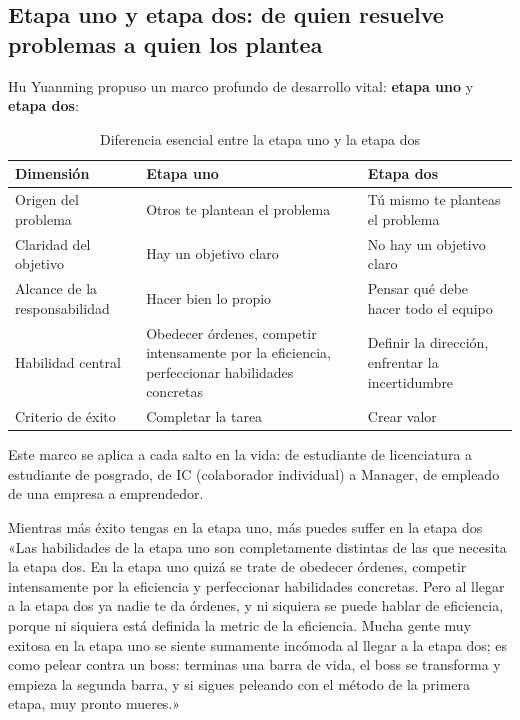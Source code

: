 \subsection{Etapa uno y etapa dos: de quien resuelve problemas a quien los plantea}

Hu Yuanming propuso un marco profundo de desarrollo vital: \textbf{etapa uno} y \textbf{etapa dos}:

\begin{table}[H]
\centering
\caption{Diferencia esencial entre la etapa uno y la etapa dos}
\begin{tabular}{lll}
\toprule
\textbf{Dimensión} & \textbf{Etapa uno} & \textbf{Etapa dos} \\
\midrule
Origen del problema & Otros te plantean el problema & Tú mismo te planteas el problema \\
Claridad del objetivo & Hay un objetivo claro & No hay un objetivo claro \\
Alcance de la responsabilidad & Hacer bien lo propio & Pensar qué debe hacer todo el equipo \\
Habilidad central & Obedecer órdenes, competir intensamente por la eficiencia, perfeccionar habilidades concretas & Definir la dirección, enfrentar la incertidumbre \\
Criterio de éxito & Completar la tarea & Crear valor \\
\bottomrule
\end{tabular}
\end{table}

Este marco se aplica a cada salto en la vida: de estudiante de licenciatura a estudiante de posgrado, de IC (colaborador individual) a Manager, de empleado de una empresa a emprendedor.

\begin{warningbox}{Mientras más éxito tengas en la etapa uno, más puedes suffer en la etapa dos}
«Las habilidades de la etapa uno son completamente distintas de las que necesita la etapa dos. En la etapa uno quizá se trate de obedecer órdenes, competir intensamente por la eficiencia y perfeccionar habilidades concretas. Pero al llegar a la etapa dos ya nadie te da órdenes, y ni siquiera se puede hablar de eficiencia, porque ni siquiera está definida la metric de la eficiencia. Mucha gente muy exitosa en la etapa uno se siente sumamente incómoda al llegar a la etapa dos; es como pelear contra un boss: terminas una barra de vida, el boss se transforma y empieza la segunda barra, y si sigues peleando con el método de la primera etapa, muy pronto mueres.»
\end{warningbox}

